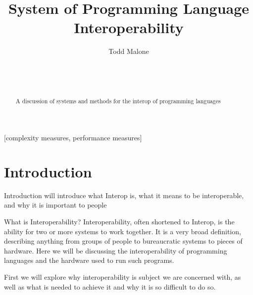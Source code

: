 \documentclass{sig-alternate}
\begin{document}

\title{System of Programming Language Interoperability}

\author{
\alignauthor
Todd Malone\\
	\\
	\\
	\\
}

\maketitle
\begin{abstract}
A discussion of systems and methods for the interop of programming languages
\end{abstract}

[complexity measures, performance measures]



\section{Introduction}\label{intro}
Introduction will introduce what Interop is, what it means to be interoperable, and
why it is important to people

What is Interoperability? Interoperability, often shortened to Interop, is the ability for two or more systems to work together. It is a very broad definition, describing anything from groups of people to bureaucratic systems to pieces of hardware. Here we will be discussing the interoperability of programming languages and the hardware used to run such programs.

First we will explore why interoperability is subject we are concerned with, as well as what is needed to achieve it and why it is so difficult to do so.
\end{document}
